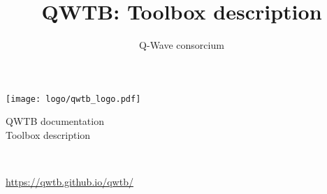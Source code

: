 \documentclass[12pt,a4paper,oneside]{report} %
\begin{document}
\renewcommand\floatpagefraction{.9} \renewcommand\topfraction{.9} \renewcommand\bottomfraction{.9} \renewcommand\textfraction{.1} \setcounter{totalnumber}{50} \setcounter{topnumber}{50} \setcounter{bottomnumber}{50} %
\renewcommand{\labelitemi}{--}          %
\setlength{\unitlength}{1mm}            %

\newenvironment{tightdesc}{\begin{description}[itemsep=0pt]} 
                              {\end{description}}

\def\infosection{Description}
\def\examplesection{Example}
\renewcommand{\chaptername}{}

\title{QWTB: Toolbox description}
\author{Q-Wave consorcium}

\thispagestyle{empty}
\begin{center}
        \vspace*{10em}
        {\huge
        \texttt{[image: logo/qwtb\_logo.pdf]}

        \vspace{2.0em}
        QWTB documentation\\

        \vspace{1.5em}
        Toolbox description}\\

        \vfill
        {\Large \color{red}{QWTB version 0.2}}

        \vspace{1em}
        {\Large \url{https://qwtb.github.io/qwtb/}}
\end{center}
\newpage
\startcontents[maintoc]
\end{document}
